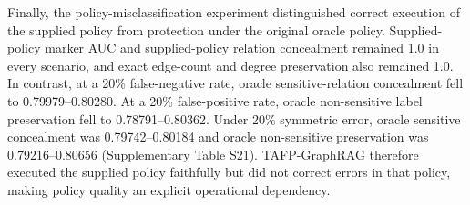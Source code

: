\documentclass[preprint,12pt]{elsarticle}
\begin{document}
Finally, the policy-misclassification experiment distinguished correct execution of the supplied policy from protection under the original oracle policy. Supplied-policy marker AUC and supplied-policy relation concealment remained 1.0 in every scenario, and exact edge-count and degree preservation also remained 1.0. In contrast, at a 20\% false-negative rate, oracle sensitive-relation concealment fell to 0.79979--0.80280. At a 20\% false-positive rate, oracle non-sensitive label preservation fell to 0.78791--0.80362. Under 20\% symmetric error, oracle sensitive concealment was 0.79742--0.80184 and oracle non-sensitive preservation was 0.79216--0.80656 (Supplementary Table S21). TAFP-GraphRAG therefore executed the supplied policy faithfully but did not correct errors in that policy, making policy quality an explicit operational dependency.
\end{document}
